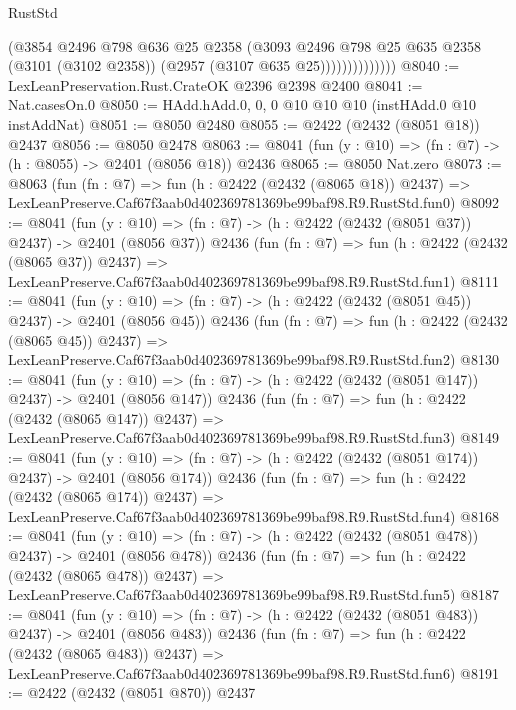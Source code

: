 \begin{lexlean}{RustStd}
\begin{coremodule}
                        (@3854
                          @2496
                          @798
                          @636
                          @25
                          @2358
                          (@3093
                            @2496
                            @798
                            @25
                            @635
                            @2358
                            (@3101 (@3102 @2358))
                            (@2957 (@3107 @635 @25))))))))))))))
@8040 := LexLeanPreservation.Rust.CrateOK @2396 @2398 @2400
@8041 := Nat.casesOn.{0}
@8050 := HAdd.hAdd.{0, 0, 0} @10 @10 @10 (instHAdd.{0} @10 instAddNat)
@8051 := @8050 @2480
@8055 := @2422 (@2432 (@8051 @18)) @2437
@8056 := @8050 @2478
@8063 := @8041 (fun (y : @10) => (fn : @7) -> (h : @8055) -> @2401 (@8056 @18)) @2436
@8065 := @8050 Nat.zero
@8073 := @8063
    (fun (fn : @7) =>
    fun (h : @2422 (@2432 (@8065 @18)) @2437) =>
    LexLeanPreserve.Caf67f3aab0d402369781369be99baf98.R9.RustStd.fun0)
@8092 := @8041
    (fun (y : @10) => (fn : @7) -> (h : @2422 (@2432 (@8051 @37)) @2437) -> @2401 (@8056 @37))
    @2436
    (fun (fn : @7) =>
    fun (h : @2422 (@2432 (@8065 @37)) @2437) =>
    LexLeanPreserve.Caf67f3aab0d402369781369be99baf98.R9.RustStd.fun1)
@8111 := @8041
    (fun (y : @10) => (fn : @7) -> (h : @2422 (@2432 (@8051 @45)) @2437) -> @2401 (@8056 @45))
    @2436
    (fun (fn : @7) =>
    fun (h : @2422 (@2432 (@8065 @45)) @2437) =>
    LexLeanPreserve.Caf67f3aab0d402369781369be99baf98.R9.RustStd.fun2)
@8130 := @8041
    (fun (y : @10) => (fn : @7) -> (h : @2422 (@2432 (@8051 @147)) @2437) -> @2401 (@8056 @147))
    @2436
    (fun (fn : @7) =>
    fun (h : @2422 (@2432 (@8065 @147)) @2437) =>
    LexLeanPreserve.Caf67f3aab0d402369781369be99baf98.R9.RustStd.fun3)
@8149 := @8041
    (fun (y : @10) => (fn : @7) -> (h : @2422 (@2432 (@8051 @174)) @2437) -> @2401 (@8056 @174))
    @2436
    (fun (fn : @7) =>
    fun (h : @2422 (@2432 (@8065 @174)) @2437) =>
    LexLeanPreserve.Caf67f3aab0d402369781369be99baf98.R9.RustStd.fun4)
@8168 := @8041
    (fun (y : @10) => (fn : @7) -> (h : @2422 (@2432 (@8051 @478)) @2437) -> @2401 (@8056 @478))
    @2436
    (fun (fn : @7) =>
    fun (h : @2422 (@2432 (@8065 @478)) @2437) =>
    LexLeanPreserve.Caf67f3aab0d402369781369be99baf98.R9.RustStd.fun5)
@8187 := @8041
    (fun (y : @10) => (fn : @7) -> (h : @2422 (@2432 (@8051 @483)) @2437) -> @2401 (@8056 @483))
    @2436
    (fun (fn : @7) =>
    fun (h : @2422 (@2432 (@8065 @483)) @2437) =>
    LexLeanPreserve.Caf67f3aab0d402369781369be99baf98.R9.RustStd.fun6)
@8191 := @2422 (@2432 (@8051 @870)) @2437

\end{coremodule}
\end{lexlean}
